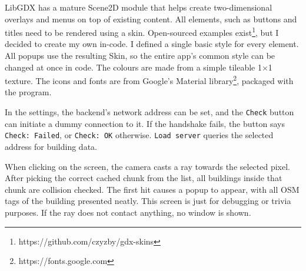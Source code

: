 LibGDX has a mature Scene2D module that helps create two-dimensional overlays and menus on top of existing content. All elements, such as buttons and titles need to be rendered using a skin. Open-sourced examples exist\footnote{https://github.com/czyzby/gdx-skins}, but I decided to create my own in-code. I defined a single basic style for every element. All popups use the resulting Skin, so the entire app's common style can be changed at once in code. The colours are made from a simple tileable 1$\times$1 texture. The icons and fonts are from Google's Material library\footnote{https://fonts.google.com}, packaged with the program.

In the settings, the backend's network address can be set, and the \verb|Check| button can initiate a dummy connection to it. If the handshake fails, the button says \verb|Check: Failed|, or \verb|Check: OK| otherwise. \verb|Load server| queries the selected address for building data.

When clicking on the screen, the camera casts a ray towards the selected pixel. After picking the correct cached chunk from the list, all buildings inside that chunk are collision checked. The first hit causes a popup to appear, with all OSM tags of the building presented neatly. This screen is just for debugging or trivia purposes. If the ray does not contact anything, no window is shown.